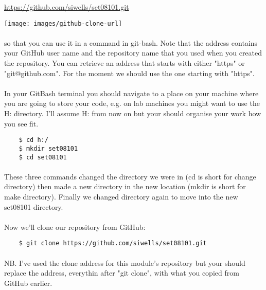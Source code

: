 \documentclass[10pt, a4paper]{article}
\begin{document}
    \url{https://github.com/siwells/set08101.git}


\texttt{[image: images/github-clone-url]}

\paragraph{} so that you can use it in a command in git-bash. Note that the address contains your GitHub user name and the repository name that you used when you created the repository. You can retrieve an address that starts with either "https" or "git@github.com". For the moment we should use the one starting with "https".

\paragraph{} In your GitBash terminal you should navigate to a place on your machine where you are going to store your code, e.g. on lab machines you might want to use the H: directory. I'll assume H: from now on but your should organise your work how you see fit.

\begin{lstlisting}
    $ cd h:/
    $ mkdir set08101
    $ cd set08101
\end{lstlisting}

\paragraph{} These three commands changed the directory we were in (cd is short for change directory) then made a new directory in the new location (mkdir is short for make directory). Finally we changed directory again to move into the new set08101 directory.

\paragraph{} Now we'll clone our repository from GitHub:

\begin{lstlisting}
    $ git clone https://github.com/siwells/set08101.git
\end{lstlisting}

\paragraph{} NB. I've used the clone address for this module's repository but your should replace the address, everythin after "git clone", with what you copied from GitHub earlier.
\end{document}
